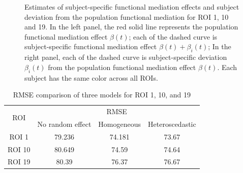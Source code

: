 \begin{figure}[h!]
\centering
\caption{Estimates of subject-specific functional mediation effects and subject deviation from the population functional mediation for ROI 1, 10 and 19. In the left panel, the red solid line represents the population functional mediation effect  $\beta(t)$; each of the dashed curve is subject-specific functional mediation effect $ \beta(t) + \beta_i(t)$; In the right panel, each of  the dashed curve is subject-specific deviation $\beta_i(t)$ from the population functional mediation effect $ \beta(t)$. Each subject has the same color across all ROIs.}
\label{betat}
\end{figure}



\begin{table}[!h]
 \caption{RMSE comparison of three models for ROI 1, 10, and 19}   
 \centering
\begin{tabular}{ c | c   c   c  }\hline\hline
 \multirow{2}{*}{ROI}
  & \multicolumn{3}{c}{RMSE}  \\ \cline{2-4}
  & No random effect  & Homogeneous & Heteroscedastic \\
  \cline{1-4}
ROI 1 &  79.236  & 74.181 & 73.67 \\ \cline{1-4}
ROI 10 & 80.649 & 74.59 &  74.64 \\ \cline{1-4}
ROI 19 & 80.39 & 76.37 & 76.67\\
\hline
\hline
 \end{tabular}  
\end{table}
  
  
